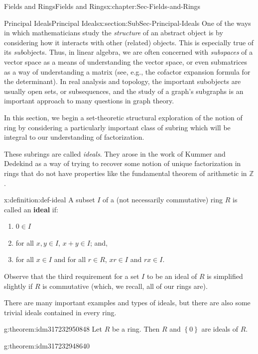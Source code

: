 \documentclass[oneside,10pt,]{book}
\newcommand{\terminology}[1]{\textbf{#1}}
\numberwithin{equation}{section}
\newcommand{\set}[1]{\left\{ {#1} \right\}}
\def\Z{{\mathbb Z}}
\begin{document}
\begin{chapterptx}{Fields and Rings}{}{Fields and Rings}{}{}{x:chapter:Sec-Fields-and-Rings}
\typeout{************************************************}
%
\begin{sectionptx}{Principal Ideals}{}{Principal Ideals}{}{}{x:section:SubSec-Principal-Ideals}
One of the ways in which mathematicians study the \emph{structure} of an abstract object is by considering how it interacts with other (related) objects. This is especially true of its \emph{sub}objects. Thus, in linear algebra, we are often concerned with \emph{subspaces} of a vector space as a means of understanding the vector space, or even submatrices as a way of understanding a matrix (see, e.g., the cofactor expansion formula for the determinant). In real analysis and topology, the important subobjects are usually open sets, or subsequences, and the study of a graph's subgraphs is an important approach to many questions in graph theory.%
\par
In this section, we begin a set-theoretic structural exploration of the notion of ring by considering a particularly important class of subring which will be integral to our understanding of factorization.%
\par
These subrings are called \emph{ideals}. They arose in the work of Kummer and Dedekind as a way of trying to recover some notion of unique factorization in rings that do not have properties like the fundamental theorem of arithmetic in \(\Z\).%
\begin{definition}{}{x:definition:def-ideal}%
A subset \(I\) of a (not necessarily commutative) ring \(R\) is called an \terminology{ideal} if:%
\begin{enumerate}
\item{}\(0\in I\)%
\item{}for all \(x,y\in I\), \(x+y\in I\); and,%
\item{}for all \(x\in I\) and for all \(r\in R\), \(xr\in I\) and \(rx\in I\).%
\end{enumerate}
%
\end{definition}
Observe that the third requirement for a set \(I\) to be an ideal of \(R\) is simplified slightly if \(R\) is commutative (which, we recall, all of our rings are).%
\par
There are many important examples and types of ideals, but there are also some trivial ideals contained in every ring.%
\begin{theorem}{}{}{g:theorem:idm317232950848}%
Let \(R\) be a ring. Then \(R\) and \(\set{0}\) are ideals of \(R\).%
\end{theorem}
\begin{theorem}{}{}{g:theorem:idm317232948640}%

\end{theorem}
\end{sectionptx}
\end{chapterptx}
\end{document}
